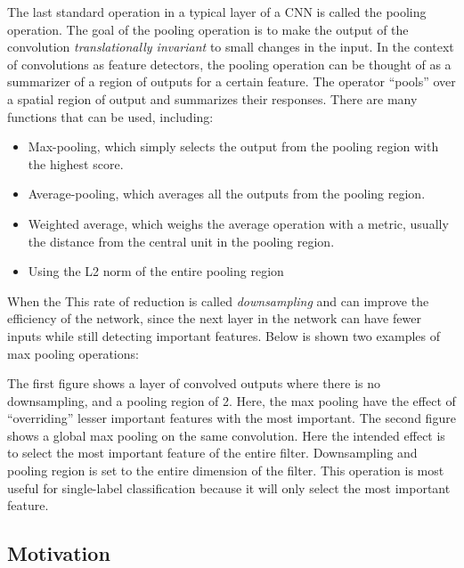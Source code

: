 The last standard operation in a typical layer of a CNN is called the pooling operation. The goal of the pooling operation is to make the output of the convolution \emph{translationally invariant} to small changes in the input. In the context of convolutions as feature detectors, the pooling operation can be thought of as a summarizer of a region of outputs for a certain feature. The operator ``pools'' over a spatial region of output and summarizes their responses. There are many functions that can be used, including:

\begin{itemize}

\item Max-pooling, which simply selects the output from the pooling region with the highest score.
\item Average-pooling, which averages all the outputs from the pooling region.
\item Weighted average, which weighs the average operation with a metric, usually the distance from the central unit in the pooling region.
\item Using the L2 norm of the entire pooling region

\end{itemize} 

When the 
This rate of reduction is called \emph{downsampling} and can improve the efficiency of the network, since the next layer in the network can have fewer inputs while still detecting important features. Below is shown two examples of 
max pooling operations:





The first figure shows a layer of convolved outputs where there is no downsampling, and a pooling region of 2. Here, the max pooling have the effect of ``overriding'' lesser important features with the most important. The second figure shows a global max pooling on the same convolution. Here the intended effect is to select the most important feature of the entire filter. Downsampling and pooling region is set to the entire dimension of the filter. This operation is most useful for single-label classification because it will only select the most important feature. 




\subsection{Motivation}

